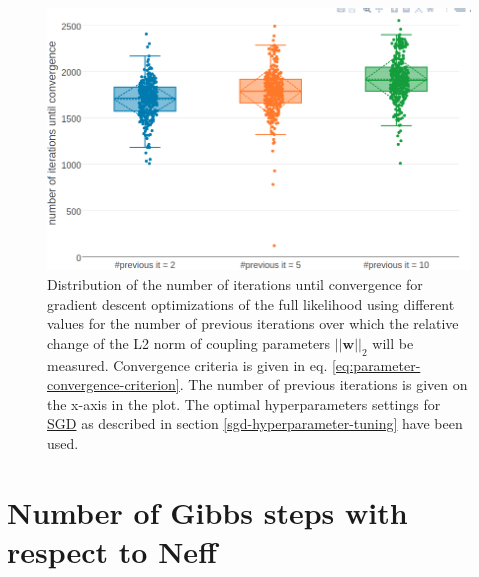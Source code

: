 \documentclass[11pt,a4paper,twoside]{book}
\newcommand{\w}{\mathbf{w}}
\theoremstyle{definition}
\theoremstyle{definition}
\theoremstyle{remark}
\begin{document}
\begin{figure}

{\centering \includegraphics[width=1\linewidth]{img/full_likelihood/appendix/distribution_numiterations_against_convergence_prev} 

}

\caption{Distribution of the
number of iterations until convergence for gradient descent
optimizations of the full likelihood using different values for the
number of previous iterations over which the relative change of the L2
norm of coupling parameters \(||\w||_2\) will be measured. Convergence
criteria is given in eq. \eqref{eq:parameter-convergence-criterion}. The
number of previous iterations is given on the x-axis in the plot. The
optimal hyperparameters settings for \protect\hyperlink{abbrev}{SGD} as
described in section \ref{sgd-hyperparameter-tuning} have been used.}\label{fig:numit-convergence-convergence-prev}
\end{figure}

\section{Number of Gibbs steps with respect to
Neff}\label{number-of-gibbs-steps-with-respect-to-neff}
\end{document}
